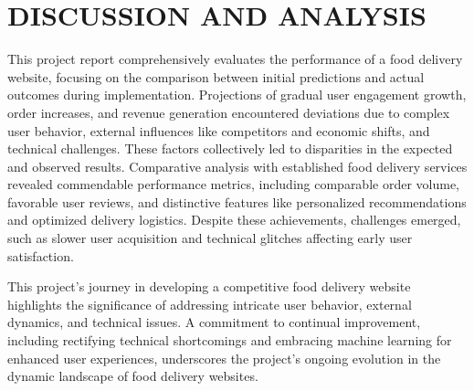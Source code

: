\newpage
\chapter{DISCUSSION AND ANALYSIS}
This project report comprehensively evaluates the performance of a food delivery website, focusing on the comparison between initial predictions and actual outcomes during implementation. Projections of gradual user engagement growth, order increases, and revenue generation encountered deviations due to complex user behavior, external influences like competitors and economic shifts, and technical challenges. These factors collectively led to disparities in the expected and observed results.
Comparative analysis with established food delivery services revealed commendable performance metrics, including comparable order volume, favorable user reviews, and distinctive features like personalized recommendations and optimized delivery logistics. Despite these achievements, challenges emerged, such as slower user acquisition and technical glitches affecting early user satisfaction.

This project's journey in developing a competitive food delivery website highlights the significance of addressing intricate user behavior, external dynamics, and technical issues. A commitment to continual improvement, including rectifying technical shortcomings and embracing machine learning for enhanced user experiences, underscores the project's ongoing evolution in the dynamic landscape of food delivery websites.

